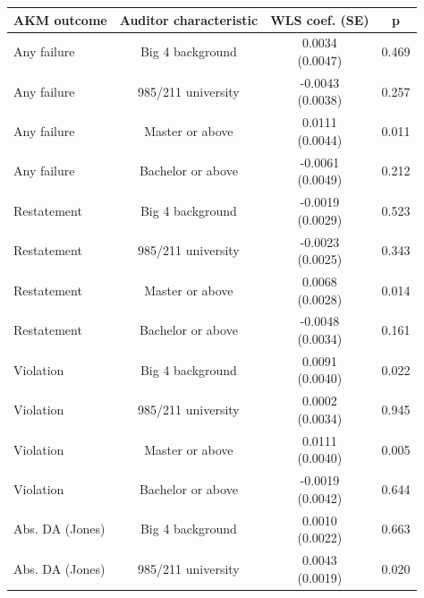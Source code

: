 \documentclass[10pt]{article}
\begin{document}
\begin{minipage}{19cm}\fontsize{10}{12}\selectfont\setlength{\tabcolsep}{4pt}\renewcommand{\arraystretch}{1.12}


\centering
{}
\begin{threeparttable}
\begin{tabular}{p{}ccc}
\toprule
AKM outcome & Auditor characteristic & WLS coef. (SE) & p \\
\midrule
Any failure & Big 4 background & \shortstack{0.0034\\(0.0047)} & 0.469 \\
Any failure & 985/211 university & \shortstack{-0.0043\\(0.0038)} & 0.257 \\
Any failure & Master or above & \shortstack{0.0111\\(0.0044)} & 0.011 \\
Any failure & Bachelor or above & \shortstack{-0.0061\\(0.0049)} & 0.212 \\
Restatement & Big 4 background & \shortstack{-0.0019\\(0.0029)} & 0.523 \\
Restatement & 985/211 university & \shortstack{-0.0023\\(0.0025)} & 0.343 \\
Restatement & Master or above & \shortstack{0.0068\\(0.0028)} & 0.014 \\
Restatement & Bachelor or above & \shortstack{-0.0048\\(0.0034)} & 0.161 \\
Violation & Big 4 background & \shortstack{0.0091\\(0.0040)} & 0.022 \\
Violation & 985/211 university & \shortstack{0.0002\\(0.0034)} & 0.945 \\
Violation & Master or above & \shortstack{0.0111\\(0.0040)} & 0.005 \\
Violation & Bachelor or above & \shortstack{-0.0019\\(0.0042)} & 0.644 \\
Abs. DA (Jones) & Big 4 background & \shortstack{0.0010\\(0.0022)} & 0.663 \\
Abs. DA (Jones) & 985/211 university & \shortstack{0.0043\\(0.0019)} & 0.020 \\

\end{tabular}
\end{threeparttable}
\end{minipage}
\end{document}
